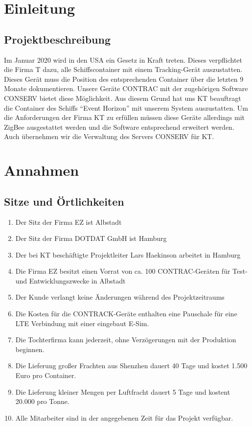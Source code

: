 

\section{Einleitung}
\subsection{Projektbeschreibung}
Im Januar 2020 wird in den USA ein Gesetz in Kraft treten. Dieses verpflichtet die Firma T dazu, alle Schiffscontainer mit einem Tracking-Gerät auszustatten. Dieses Gerät muss die Position des entsprechenden Container über die letzten 9 Monate dokumentieren. Unsere Geräte CONTRAC mit der zugehörigen Software CONSERV bietet diese Möglichkeit. Aus diesem Grund hat uns KT beauftragt die Container des Schiffs "`Event Horizon"' mit unserem System auszustatten. Um die Anforderungen der Firma KT zu erfüllen müssen diese Geräte allerdings mit ZigBee ausgestattet werden und die Software entsprechend erweitert werden. Auch übernehmen wir die Verwaltung des Servers CONSERV für KT.
\section{Annahmen}
\subsection{Sitze und Örtlichkeiten}
\begin{enumerate}
    \item Der Sitz der Firma EZ ist Albstadt
    \item Der Sitz der Firma DOTDAT GmbH ist Hamburg
    \item Der bei KT beschäftigte Projektleiter Lars Haekinson arbeitet in Hamburg
    \item Die Firma EZ besitzt einen Vorrat von ca. 100 CONTRAC-Geräten für Test- und Entwicklungszwecke in Albstadt
    \item Der Kunde verlangt keine Änderungen während des Projektzeitraums
   
    \item Die Kosten für die CONTRACK-Geräte enthalten eine Pauschale für eine LTE Verbindung mit einer eingebaut E-Sim.
	\item Die Tochterfirma kann jederzeit, ohne Verzögerungen mit der Produktion beginnen.
    \item Die Lieferung großer Frachten aus Shenzhen dauert 40 Tage und kostet 1.500 Euro pro Container.
    \item Die Lieferung kleiner Mengen per Luftfracht dauert 5 Tage und kostent 20.000 pro Tonne.
    \item Alle Mitarbeiter sind in der angegebenen Zeit für das Projekt verfügbar.
\end{enumerate}

